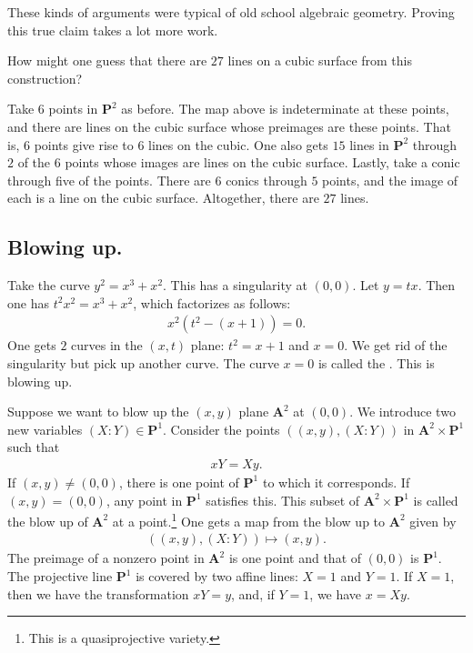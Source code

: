 \documentclass [11 pt, oneside] {article}
\begin{document}
These kinds of arguments were typical of old school algebraic geometry. Proving this true claim takes a lot more work.

\begin{problem}
	How might one guess that there are $27$ lines on a cubic surface from this construction?
\end{problem}

Take $6$ points in $\mathbf{P}^2$ as before. The map above is indeterminate at these points, and there are lines on the cubic surface whose preimages are these points. That is, $6$ points give rise to $6$ lines on the cubic. One also gets $15$ lines in $\mathbf{P}^2$ through $2$ of the $6$ points whose images are lines on the cubic surface. Lastly, take a conic through five of the points. There are $6$ conics through $5$ points, and the image of each is a line on the cubic surface. Altogether, there are $27$ lines.

\subsection{Blowing up.}
\begin{example}[ ]\label{}
Take the curve $y^2 = x^3 +x^2$. This has a singularity at $(0,0)$. Let $y=tx$. Then one has $t^2x^2 = x^3+x^2$, which factorizes as follows:
\begin{align*}
x^2(t^2 - (x+1)) =0.
\end{align*}
One gets $2$ curves in the $(x,t)$ plane: $t^2=x+1$ and $x=0$. We get rid of the singularity but pick up another curve. The curve $x=0$ is called the . This is blowing up.
\end{example}


Suppose we want to blow up the $(x,y)$ plane $\mathbf{A}^2$ at $(0,0)$. We introduce two new variables $(X:Y)\in  \mathbf{P}^1$. Consider the points $((x,y),  (X:Y))$ in $\mathbf{A}^2\times \mathbf{P}^1$ such that 
\begin{align*}
	xY = Xy.
\end{align*}
If $(x,y)\ne (0,0)$, there is one point of $\mathbf{P}^1$ to which it corresponds. If $(x,y)= (0,0)$, any point in $\mathbf{P}^1$ satisfies this. This subset of $\mathbf{A}^2\times \mathbf{P}^1$ is called the blow up of $\mathbf{A}^2$ at a point.\footnote{This is a quasiprojective variety.} One gets a map from the blow up to $\mathbf{A}^2$ given by
\begin{align*}
	((x,y), (X:Y)) \longmapsto (x,y).
\end{align*}
The preimage of a nonzero point in $\mathbf{A}^2$ is one point and that of $(0,0)$ is $\mathbf{P}^1$. The projective line $\mathbf{P}^1$ is covered by two affine lines: $X = 1$ and $Y=1$. If $X=1$, then we have the transformation $xY=y$, and, if $Y=1$, we have $x = Xy$.
\end{document}
